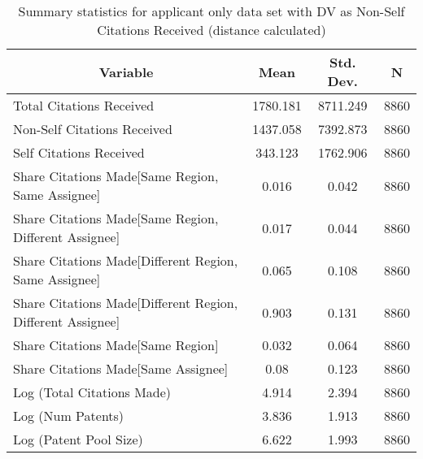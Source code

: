 
\begin{table}[htbp]\centering \caption{Summary statistics for applicant only data set with DV as Non-Self Citations Received (distance calculated) \label{a.nsummary}}
\begin{tabular}{l c c  c}\hline\hline
\multicolumn{1}{c}{\textbf{Variable}} & \textbf{Mean}
 & \textbf{Std. Dev.} & \textbf{N}\\ \hline
Total Citations Received & 1780.181 & 8711.249  & 8860\\
Non-Self Citations Received & 1437.058 & 7392.873  & 8860\\
Self Citations Received & 343.123 & 1762.906  & 8860\\
Share Citations Made[Same Region, Same Assignee] & 0.016 & 0.042  & 8860\\
Share Citations Made[Same Region, Different Assignee] & 0.017 & 0.044  & 8860\\
Share Citations Made[Different Region, Same Assignee] & 0.065 & 0.108  & 8860\\
Share Citations Made[Different Region, Different Assignee] & 0.903 & 0.131  & 8860\\
Share Citations Made[Same Region] & 0.032 & 0.064  & 8860\\
Share Citations Made[Same Assignee] & 0.08 & 0.123  & 8860\\
Log (Total Citations Made) & 4.914 & 2.394  & 8860\\
Log (Num Patents) & 3.836 & 1.913  & 8860\\
Log (Patent Pool Size) & 6.622 & 1.993  & 8860\\
\hline\end{tabular}
\end{table}
